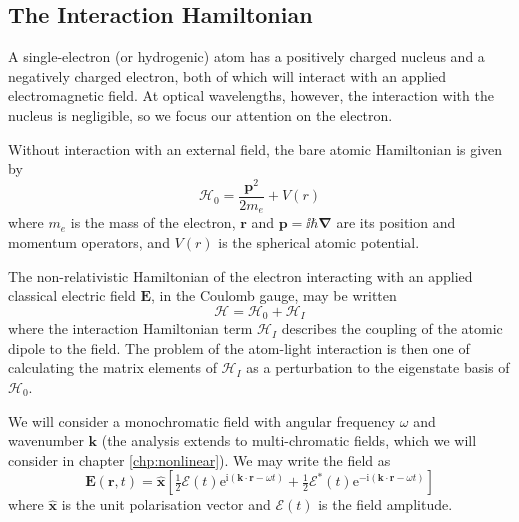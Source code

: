   \subsection{The Interaction Hamiltonian}

    A single-electron (or hydrogenic) atom has a positively charged nucleus and
    a negatively charged electron, both of which will interact with an applied
    electromagnetic field. At optical wavelengths, however, the interaction with
    the nucleus is negligible\cite{bransden2003physics}, so we focus our
    attention on the electron.

    Without interaction with an external field, the bare atomic Hamiltonian is
    given by
    \begin{equation}
      \mathcal{H}_0 = \frac{\mathbf{p}^2}{2 m_e} + V(r)
    \end{equation}
    where $m_e$ is the mass of the electron, $\mathbf{r}$ and $\mathbf{p} = \ii
    \hbar \mathbf{\nabla}$ are its position and momentum operators, and $V(r)$
    is the spherical atomic potential.

    The non-relativistic Hamiltonian of the electron interacting with an applied
    classical electric field $\mathbf{E}$, in the Coulomb gauge, may be written
    \begin{equation}
        \mathcal{H} = \mathcal{H}_0 + \mathcal{H}_I
    \end{equation}
    where the interaction Hamiltonian term $\mathcal{H}_I$ describes the
    coupling of the atomic dipole to the field.\cite{bransden2003physics}  The
    problem of the atom-light interaction is then one of calculating the matrix
    elements of $\mathcal{H}_I$ as a perturbation to the eigenstate basis of
    $\mathcal{H}_0$.

    We will consider a monochromatic field with angular frequency $\omega$ and
    wavenumber $\mathbf{k}$ (the analysis extends to multi-chromatic fields,
    which we will consider in chapter \ref{chp:nonlinear}). We may write the
    field as
    \begin{equation}\label{eqn:envelope_carrier}
      \mathbf{E}(\mathbf{r}, t) = \hat{\mathbf{x}} 
      \left[ \tfrac{1}{2} \mathcal{E}(t) 
      \mathrm{e}^{\mathrm{i}(\mathbf{k} \cdot \mathbf{r} - \omega t)} + 
      \tfrac{1}{2} \mathcal{E}^*(t) \mathrm{e}^{-\mathrm{i}(\mathbf{k} \cdot 
      \mathbf{r} - \omega t)} \right]
    \end{equation}
    where $\hat{\mathbf{x}}$ is the unit polarisation vector and 
    $\mathcal{E}(t)$ is the field amplitude.    

